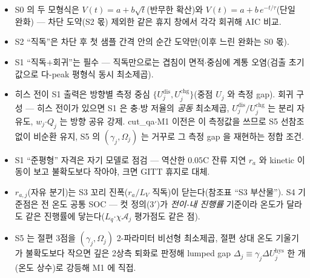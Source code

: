 \documentclass[11pt,a4paper]{article}
\newcommand{\dis}{\mathrm{dis}}
\newcommand{\chg}{\mathrm{chg}}
\newcommand{\hys}{\mathrm{hys}}
\begin{document}
\begin{itemize}[leftmargin=1.6em,itemsep=1pt]
\item S0 의 두 모형식은 $V(t)=a+b\sqrt t$(반무한 확산)와 $V(t)=a+b\,e^{-t/\tau}$(단일 완화) — 차단 도약(S2 몫) 제외한 같은 휴지 창에서 각각 회귀해 AIC 비교.
\item S2 ``직독''은 차단 후 첫 샘플 간격 안의 순간 도약만(이후 느린 완화는 S0 몫).
\item S1 ``직독$+$회귀''는 필수 — 직독만으로는 겹침이 면적$\cdot$중심에 계통 오염(검출 초기값으로 다-peak 평형식 동시 최소제곱).
\item 히스 전이 S1 출력은 방향별 측정 중심 $\{U_j^{\dis},U_j^{\chg}\}$(중점 $U_j$ 와 측정 gap). 회귀 구성 — 히스 전이가 있으면 S1 은 충$\cdot$방 저율의 \emph{공동} 최소제곱, $U_j^{\dis}/U_j^{\chg}$ 는 분리 자유도, $w_j$$\cdot$$Q_j$ 는 방향 공유 강제. cut\_qa$\cdot$M1 이전은 이 측정값을 쓰므로 S5 선참조 없이 비순환 유지, S5 의 $(\gamma_j,\Omega_j)$ 는 거꾸로 그 측정 gap 을 재현하는 정합 조건.
\item S1 ``준평형'' 자격은 자기 모델로 점검 — 역산한 $0.05$C 잔류 지연 $r_a$ 와 kinetic 이동이 보고 불확도보다 작아야, 크면 GITT 휴지로 대체.
\item $r_{a,j}$(자유 분기)는 S3 꼬리 진폭($r_a/L_V$ 직독)이 닫는다(참조표 ``S3 부산물''). S4 기준점은 전 온도 공통 SOC — 컷 정의(3$'$)가 \emph{전이-내 진행률} 기준이라 온도가 달라도 같은 진행률에 닿는다($L_q$$\cdot$$\chi\mathcal A_j$ 평가점도 같은 점).
\item S5 는 절편 3점을 $(\gamma_j,\Omega_j)$ 2-파라미터 비선형 최소제곱, 절편 상대 온도 기울기가 불확도보다 작으면 깊은 2상측 퇴화로 판정해 lumped gap $\Delta_j\equiv\gamma_j\Delta U_j^\hys$ 한 개(온도 상수)로 강등해 M1 에 직접.
\end{itemize}
\end{document}
